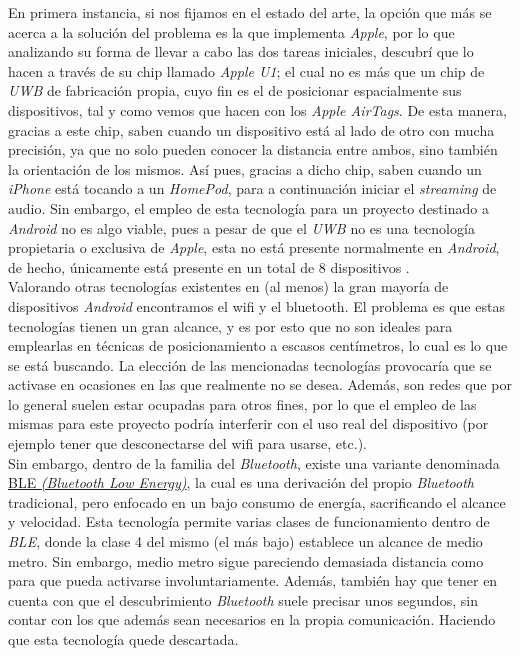 En primera instancia, si nos fijamos en el estado del arte, la opción que más se
acerca a la solución del problema es la que implementa \emph{Apple}, por lo que
analizando su forma de llevar a cabo las dos tareas iniciales, descubrí que lo
hacen a través de su chip llamado \emph{Apple U1}; el cual no es más que un chip
de \emph{UWB} \cite{uwb-explicado} de fabricación propia, cuyo fin es el de
posicionar espacialmente sus dispositivos, tal y como vemos que hacen con los
\emph{Apple AirTags}. De esta manera, gracias a este chip, saben cuando un
dispositivo está al lado de otro con mucha precisión, ya que no solo pueden
conocer la distancia entre ambos, sino también la orientación de los mismos. Así
pues, gracias a dicho chip, saben cuando un \emph{iPhone} está tocando a un
\emph{HomePod}, para a continuación iniciar el \emph{streaming} de audio. Sin
embargo, el empleo de esta tecnología para un proyecto destinado a
\emph{Android} no es algo viable, pues a pesar de que el \emph{UWB} no es una
tecnología propietaria o exclusiva de \emph{Apple}, esta no está presente
normalmente en \emph{Android}, de hecho, únicamente está presente en un total de 8
dispositivos \cite{uwb-android}. \\

Valorando otras tecnologías existentes en (al menos) la gran mayoría de
dispositivos \emph{Android} encontramos el wifi y el bluetooth. El problema es
que estas tecnologías tienen un gran alcance, y es por esto que no son ideales
para emplearlas en técnicas de posicionamiento a escasos centímetros, lo cual es
lo que se está buscando. La elección de las mencionadas tecnologías provocaría que se
activase en ocasiones en las que realmente no se desea. Además, son redes que
por lo general suelen estar ocupadas para otros fines, por lo que el empleo de las
mismas para este proyecto podría interferir con el uso real del dispositivo (por
ejemplo tener que desconectarse del wifi para usarse, etc.).\\

Sin embargo, dentro de la familia del \emph{Bluetooth}, existe una variante
denominada \href{https://en.wikipedia.org/wiki/Bluetooth_Low_Energy}{BLE
\emph{(Bluetooth Low Energy)}}, la cual es una derivación del propio
\emph{Bluetooth} tradicional, pero enfocado en un bajo consumo de energía,
sacrificando el alcance y velocidad. Esta tecnología permite varias clases de
funcionamiento dentro de \emph{BLE}, donde la clase 4 del mismo (el más bajo)
establece un alcance de medio metro. Sin embargo, medio metro sigue
pareciendo demasiada distancia como para que pueda activarse involuntariamente.
Además, también hay que tener en cuenta con que el descubrimiento \emph{Bluetooth} suele
precisar unos segundos, sin contar con los que además sean necesarios en la
propia comunicación. Haciendo que esta tecnología quede descartada.\\

